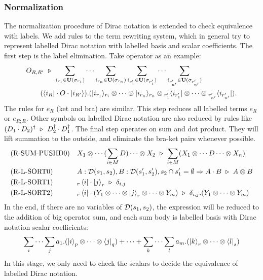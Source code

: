 \subsubsection{Normalization}
The normalization procedure of Dirac notation is extended to check equivalence with labels.
We add rules to the term rewriting system, which in general try to represent labelled Dirac notation with labelled basis and scalar coefficients. The first step is the label elimination. Take operator as an example:
\begin{align*}
    & O_{R,R'} \ \triangleright\ \sum_{i_{r_1}\in\mathbf{U}(\sigma_{r_1})}\cdots \sum_{i_{r_n}\in\mathbf{U}(\sigma_{r_n})}
    \sum_{i_{r'_1}\in\mathbf{U}(\sigma_{r'_1})}\cdots \sum_{i_{r'_{n'}}\in\mathbf{U}(\sigma_{r'_{n'}})} \\
    & \qquad (\langle i_R|\cdot O\cdot |i_{R'}\rangle).(|i_{r_1}\rangle_{r_i}\otimes\cdots\otimes|i_{r_n}\rangle_{r_n} \otimes {}_{r'_1}\langle i_{r'_1}|\otimes\cdots\otimes{}_{r'_{n'}}\langle i_{r'_{n'}}|).
\end{align*}
The rules for $e_R$ (ket and bra) are similar. This step reduces all labelled terms $e_R$ or $e_{R;R}$.
Other symbols on labelled Dirac notation are also reduced by rules like $(D_1 \cdot D_2)^\dagger \ \triangleright\ D_2^\dagger \cdot D_1^\dagger$.
The final step operates on sum and dot product. They will lift summation to the outside, and eliminate the bra-ket pairs whenever possible.
\begin{align*}
    & \textrm{(R-SUM-PUSHD0)}
    && X_1 \otimes \cdots (\sum_{i \in M} D) \cdots \otimes X_2\ \triangleright\ \sum_{i \in M} (X_1 \otimes \cdots D \cdots \otimes X_n) \\
    & \textrm{(R-L-SORT0)}
    && A : \mathcal{D}(s_1, s_2), B : \mathcal{D}(s_1', s_2'), s_2 \cap s_1'=\emptyset \Rightarrow A \cdot B \ \triangleright\ A \otimes B \\
    & \textrm{(R-L-SORT1)}
    && {}_r\bra{i}\cdot\ket{j}_r \ \triangleright\ \delta_{i, j} \\
    & \textrm{(R-L-SORT2)}
    && {}_r\bra{i}\cdot(Y_1 \otimes \cdots \otimes \ket{j}_r \otimes \cdots \otimes Y_m) \ \triangleright\ \delta_{i, j}.(Y_1  \otimes \cdots \otimes Y_m)
\end{align*}
In the end, if there are no variables of $\mathcal{D}(s_1, s_2)$, the expression will be reduced to the addition of big operator sum, and each sum body is labelled basis with Dirac notation scalar coefficients:
\[
    \sum_{i}\cdots\sum_{j} a_1 . (\ket{i}_{p} \otimes \cdots \otimes \bra{j}_{q})
    + \cdots +
    \sum_{k}\cdots\sum_{l} a_m . (\ket{k}_{r} \otimes \cdots \otimes \bra{l}_{s})
\]
In this stage, we only need to check the scalars to decide the equivalence of labelled Dirac notation.

